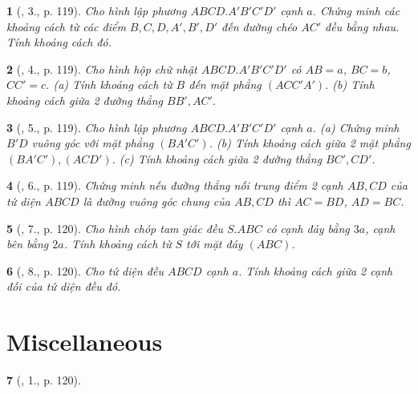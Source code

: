 \documentclass{article}
\newtheorem{baitoan}{}
\begin{document}
\begin{baitoan}[\cite{SGK_Toan_11_hinh_hoc_co_ban}, 3., p. 119]
	Cho hình lập phương $ABCD.A'B'C'D'$ cạnh $a$. Chứng minh các khoảng cách từ các điểm $B,C,D,A',B',D'$ đến đường chéo $AC'$ đều bằng nhau. Tính khoảng cách đó.
\end{baitoan}

\begin{baitoan}[\cite{SGK_Toan_11_hinh_hoc_co_ban}, 4., p. 119]
	Cho hình hộp chữ nhật $ABCD.A'B'C'D'$ có $AB = a$, $BC = b$, $CC' = c$. (a) Tính khoảng cách từ $B$ đến mặt phẳng $(ACC'A')$. (b) Tính khoảng cách giữa 2 đường thẳng $BB',AC'$.
\end{baitoan}

\begin{baitoan}[\cite{SGK_Toan_11_hinh_hoc_co_ban}, 5., p. 119]
	Cho hình lập phương $ABCD.A'B'C'D'$ cạnh $a$. (a) Chứng minh $B'D$ vuông góc với mặt phẳng $(BA'C')$. (b) Tính khoảng cách giữa 2 mặt phẳng $(BA'C'),(ACD')$. (c) Tính khoảng cách giữa 2 đường thẳng $BC',CD'$.
\end{baitoan}

\begin{baitoan}[\cite{SGK_Toan_11_hinh_hoc_co_ban}, 6., p. 119]
	Chứng minh nếu đường thẳng nối trung điểm 2 cạnh $AB,CD$ của tứ diện $ABCD$ là đường vuông góc chung của $AB,CD$ thì $AC = BD$, $AD = BC$.
\end{baitoan}

\begin{baitoan}[\cite{SGK_Toan_11_hinh_hoc_co_ban}, 7., p. 120]
	Cho hình chóp tam giác đều $S.ABC$ có cạnh đáy bằng $3a$, cạnh bên bằng $2a$. Tính khoảng cách từ $S$ tới mặt đáy $(ABC)$.
\end{baitoan}

\begin{baitoan}[\cite{SGK_Toan_11_hinh_hoc_co_ban}, 8., p. 120]
	Cho tứ diện đều $ABCD$ cạnh $a$. Tính khoảng cách giữa 2 cạnh đối của tứ diện đều đó.
\end{baitoan}


\section{Miscellaneous}

\begin{baitoan}[\cite{SGK_Toan_11_hinh_hoc_co_ban}, 1., p. 120]
	
\end{baitoan}
\end{document}
